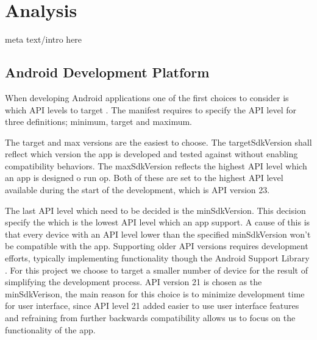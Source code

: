 \section{Analysis}
meta text/intro here
\subsection{Android Development Platform}
When developing Android applications one of the first choices to consider is which API levels to target \cite{usesSDK}.
The manifest requires to specify the API level for three definitions; minimum, target and maximum.

The target and max versions are the easiest to choose.
The targetSdkVersion shall reflect which version the app is developed and tested against without enabling compatibility behaviors.
The maxSdkVersion reflects the highest API level which an app is designed o run op.
Both of these are set to the highest API level available during the start of the development, which is API version 23.

The last API level which need to be decided is the minSdkVersion.
This decision specify the which is the lowest API level which an app support.
A cause of this is that every device with an API level lower than the specified minSdkVersion won't be compatible with the app.
Supporting older API versions requires development efforts, typically implementing functionality though the Android Support Library \cite{androidSL}.
For this project we choose to target a smaller number of device for the result of simplifying the development process.
API version 21 is chosen as the minSdkVerison, the main reason for this choice is to minimize development time for user interface, since API level 21 added easier to use user interface features \cite{android5API} and refraining from further backwards compatibility allows us to focus on the functionality of the app. 